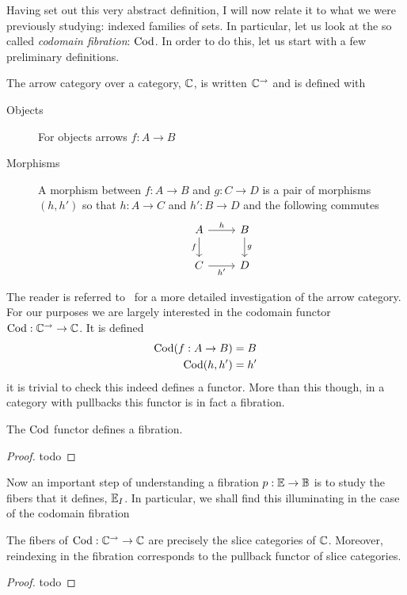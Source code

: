 Having set out this very abstract definition, I will now relate it to
what we were previously studying: indexed families of sets. In
particular, let us look at the so called \emph{codomain fibration}:
$\operatorname{Cod}$. In order to do this, let us start with a few preliminary
definitions.

\begin{defn}\label{defn:fibrations:arrowcat}
  The arrow category over a category, $\mathbb{C}$, is written
  $\mathbb{C}^{\to}$ and is defined with
  \begin{description}
  \item[Objects] For objects arrows $f : A \to B$
  \item[Morphisms] A morphism between $f : A \to B$ and $g : C \to D$
    is a pair of morphisms $(h, h')$ so that $h : A \to C$ and $h' : B
    \to D$ and the following commutes
    \[
      \begin{tikzcd}
        A \ar[d, "f", swap] \ar[r, "h"] & B \ar[d, "g"]\\
        C \ar[r, "h'", swap] & D
      \end{tikzcd}
    \]
  \end{description}
\end{defn}

The reader is referred to~\citet{MacLane:98} for a more detailed
investigation of the arrow category. For our purposes we are largely
interested in the codomain functor $\operatorname{Cod} : \mathbb{C}^{\to} \to
\mathbb{C}$. It is defined
\begin{align*}
  \operatorname{Cod}(f : A \to B) &= B\\
  \operatorname{Cod}(h, h') &= h'
\end{align*}
it is trivial to check this indeed defines a functor. More than this
though, in a category with pullbacks this functor is in fact a
fibration.
\begin{example}\label{example:fibrations:cod}
  The $\operatorname{Cod}$ functor defines a fibration.
\end{example}
\begin{proof}
  todo
\end{proof}

Now an important step of understanding a fibration
$p : \mathbb{E} \to \mathbb{B}$ is to study the fibers that it defines,
$\mathbb{E}_I$. In particular, we shall find this illuminating in the case
of the codomain fibration

\begin{lem}\label{lem:fibrations:fibersareslices}
  The fibers of $\operatorname{Cod} : \mathbb{C}^{\to} \to \mathbb{C}$ are precisely the slice
  categories of $\mathbb{C}$. Moreover, reindexing in the fibration
  corresponds to the pullback functor of slice categories.
\end{lem}
\begin{proof}
  todo
\end{proof}

